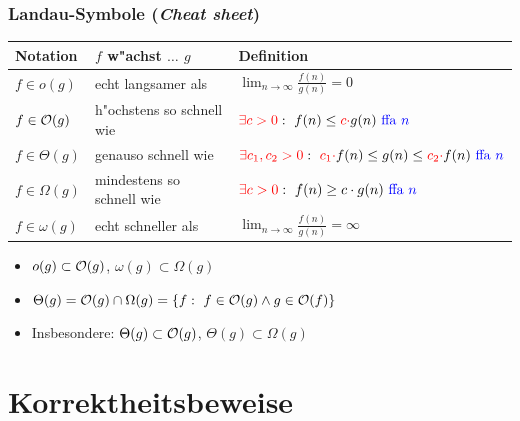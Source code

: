 \begin{frame}
  \frametitle{Landau-Symbole (\emph{Cheat sheet})}
  \begin{center}
  \begin{tabular}{| l || l | l |} \hline
  \textbf{Notation} & \textbf{$f$ w"achst $\ldots$ $g$} & \textbf{Definition} \\ \hline
  $f \in o(g)$
      & echt langsamer als
      & $\lim_{n\rightarrow \infty} \frac{f(n)}{g(n)} = 0$
      \\ \hline
  $f \in \mathcal{O}(g)$
      & \footnotesize h"ochstens so schnell wie \normalsize
      & $\textcolor{red}{\exists c > 0}: \
          f(n) \leq \textcolor{red}{c\cdot} g(n) \textcolor{blue}{\text{ ffa } n}$
      \\ \hline
  $f \in \Theta(g)$
      & genauso schnell wie
      & \footnotesize $\textcolor{red}{\exists c_1, c_2 > 0}:
        \ \textcolor{red}{c_1\cdot} f(n)
            \leq g(n)
            \leq \textcolor{red}{c_2 \cdot} f(n)
          \textcolor{blue}{\text{ ffa } n}$ \normalsize
      \\ \hline
  $f \in \Omega(g)$
      & \footnotesize mindestens so schnell wie \normalsize
      & $\textcolor{red}{\exists c > 0}: \ f(n) \geq c\cdot g(n) \textcolor{blue}{\text{ ffa } n}$
      \\ \hline
  $f \in \omega(g)$
      & echt schneller als
      & $\lim_{n\rightarrow \infty} \frac{f(n)}{g(n)} = \infty$
      \\ \hline
  \end{tabular}
  \end{center}
  \begin{itemize}
  \item $o(g) \subset \mathcal{O}(g)$, $\omega(g) \subset \Omega(g)$
  \item $\Theta(g) = \mathcal{O}(g) \cap \Omega(g) = \{ f:\ f \in \mathcal{O}(g) \wedge g \in \mathcal{O}(f)\}$
  \item Insbesondere: $\Theta(g) \subset \mathcal{O}(g)$, $\Theta(g) \subset \Omega(g)$
  \end{itemize}
\end{frame}

\section{Korrektheitsbeweise}
